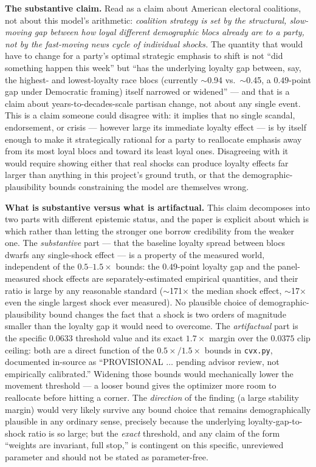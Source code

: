 \documentclass[11pt]{article}
\begin{document}
\textbf{The substantive claim.} Read as a claim about American electoral
coalitions, not about this model's arithmetic: \emph{coalition strategy is
set by the structural, slow-moving gap between how loyal different
demographic blocs already are to a party, not by the fast-moving news cycle
of individual shocks.} The quantity that would have to change for a party's
optimal strategic emphasis to shift is not ``did something happen this
week'' but ``has the underlying loyalty gap between, say, the highest- and
lowest-loyalty race blocs (currently $\sim$0.94 vs.\ $\sim$0.45, a
$0.49$-point gap under Democratic framing) itself narrowed or widened'' ---
and that is a claim about years-to-decades-scale partisan change, not about
any single event. This is a claim someone could disagree with: it implies
that no single scandal, endorsement, or crisis --- however large its
immediate loyalty effect --- is by itself enough to make it strategically
rational for a party to reallocate emphasis away from its most loyal blocs
and toward its least loyal ones. Disagreeing with it would require showing
either that real shocks can produce loyalty effects far larger than anything
in this project's ground truth, or that the demographic-plausibility bounds
constraining the model are themselves wrong.

\textbf{What is substantive versus what is artifactual.} This claim
decomposes into two parts with different epistemic status, and the paper is
explicit about which is which rather than letting the stronger one borrow
credibility from the weaker one. The \emph{substantive} part --- that the
baseline loyalty spread between blocs dwarfs any single-shock effect --- is
a property of the measured world, independent of the $0.5$--$1.5\times$
bounds: the $0.49$-point loyalty gap and the panel-measured shock effects
are separately-estimated empirical quantities, and their ratio is large by
any reasonable standard ($\sim$171$\times$ the median shock effect,
$\sim$17$\times$ even the single largest shock ever measured). No plausible
choice of demographic-plausibility bound changes the fact that a shock is
two orders of magnitude smaller than the loyalty gap it would need to
overcome. The \emph{artifactual} part is the specific $0.0633$ threshold
value and its exact $1.7\times$ margin over the $0.0375$ clip ceiling: both
are a direct function of the $0.5\times/1.5\times$ bounds in
\texttt{cvx.py}, documented in-source as ``PROVISIONAL $\dots$ pending
advisor review, not empirically calibrated.'' Widening those bounds would
mechanically lower the movement threshold --- a looser bound gives the
optimizer more room to reallocate before hitting a corner. The
\emph{direction} of the finding (a large stability margin) would very
likely survive any bound choice that remains demographically plausible in
any ordinary sense, precisely because the underlying loyalty-gap-to-shock
ratio is so large; but the \emph{exact} threshold, and any claim of the form
``weights are invariant, full stop,'' is contingent on this specific,
unreviewed parameter and should not be stated as parameter-free.
\end{document}
